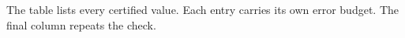 The table lists every certified value.
Each entry carries its own error budget.
The final column repeats the check.
